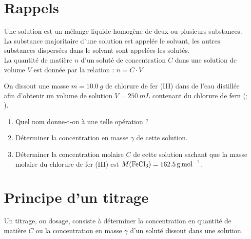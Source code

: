 \documentclass[a4paper,12pt,fleqn]{scrartcl}%
\begin{document}
	\maketitle
\section{Rappels}
Une solution est un mélange liquide homogène de deux ou plusieurs substances. La substance majoritaire d'une solution est appelée le solvant, les autres substances dispersées dans le solvant sont appelées les solutés.\\
La quantité de matière $n$ d'un soluté de concentration $C$ dans une solution de volume $V$ est donnée par la relation : $n= C \cdot V$
\begin{exemple}
    On dissout une masse $m=\SI{10,0}{g}$ de chlorure de fer (III) dans de l'eau distillée afin d'obtenir un volume de solution $V = \SI{250}{mL}$ contenant du chlorure de fern (; ).
    \begin{enumerate}
        \item Quel nom donne-t-on à une telle opération ?
        \item Déterminer la concentration en masse $\gamma$ de cette solution.
        \item Déterminer la concentration molaire $C$ de cette solution sachant que la masse molaire du chlorure de fer (III) est $M(\ce{FeCl3}) = \SI{162,5}{g.mol^{-1}}$.
    \end{enumerate}
\end{exemple}
\section{Principe d'un titrage}
Un titrage, ou dosage, consiste à déterminer la concentration en quantité de matière $C$ ou la concentration en masse $\gamma$ d'un soluté dissout dans une solution.
\end{document}
